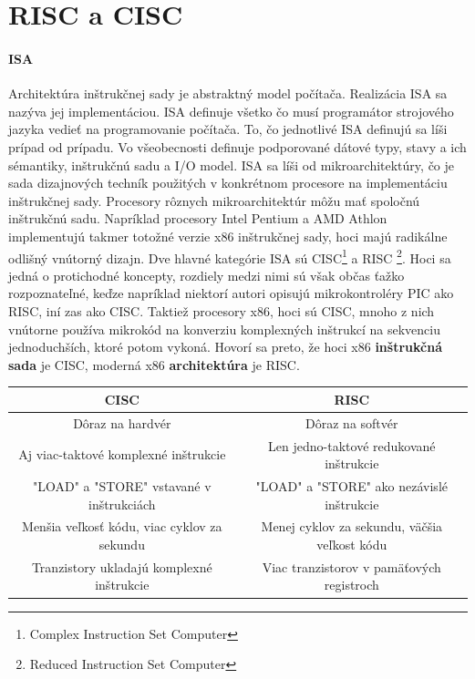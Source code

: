 \documentclass[11pt,a4paper]{report}
\begin{document}
\section{RISC a CISC} \paragraph{ISA} Architektúra inštrukčnej sady je abstraktný model počítača. Realizácia ISA sa nazýva jej implementáciou. ISA definuje všetko čo musí programátor strojového jazyka vedieť na programovanie počítača. To, čo jednotlivé ISA definujú sa líši prípad od prípadu. Vo všeobecnosti definuje podporované dátové typy, stavy a ich sémantiky, inštrukčnú sadu a I/O model. ISA sa líši od mikroarchitektúry, čo je sada dizajnových techník použitých v konkrétnom procesore na implementáciu inštrukčnej sady. Procesory rôznych mikroarchitektúr môžu mať spoločnú inštrukčnú sadu. Napríklad procesory Intel Pentium a AMD Athlon implementujú takmer totožné verzie x86 inštrukčnej sady, hoci majú radikálne odlišný vnútorný dizajn. Dve hlavné kategórie ISA sú CISC\footnote{Complex Instruction Set Computer} a RISC \footnote{Reduced Instruction Set Computer}. Hoci sa jedná o protichodné koncepty, rozdiely medzi nimi sú však občas ťažko rozpoznateľné, keďze napríklad niektorí autori opisujú mikrokontroléry PIC ako RISC, iní zas ako CISC. Taktiež procesory x86, hoci sú CISC, mnoho z nich vnútorne používa mikrokód na konverziu komplexných inštrukcí na sekvenciu jednoduchších, ktoré potom vykoná. Hovorí sa preto, že hoci x86 \textbf{inštrukčná sada} je CISC, moderná x86 \textbf{architektúra} je RISC.

\tabcolsep=0.10cm
\begin{center}
\begin{tabular}{ | c | c | }
 \hline
 CISC  & RISC \\ 
 \hline
 \hline
 Dôraz na hardvér & Dôraz na softvér\\
 \hline
  Aj viac-taktové komplexné inštrukcie & Len jedno-taktové redukované inštrukcie \\ 
 \hline
 "LOAD" a "STORE" vstavané v inštrukciách & "LOAD" a "STORE" ako nezávislé inštrukcie \\ 
 \hline
 Menšia veľkosť kódu, viac cyklov za sekundu & Menej cyklov za sekundu, väčšia veľkost kódu \\ 
 \hline
 Tranzistory ukladajú komplexné inštrukcie & Viac tranzistorov v pamäťových registroch \\ 
 \hline
\end{tabular}
\end{center}
\end{document}
